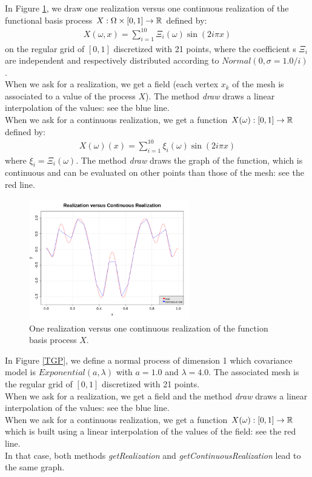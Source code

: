              In Figure \ref{FBP}, we draw one realization versus one continuous realization of the functional basis process $X: \Omega \times [0,1] \rightarrow {\mathbb R}$ defined by:
             \begin{align}
               X(\omega, x)=\sum_{i=1}^{10} \Xi_{i}(\omega)\sin(2i\pi x)
             \end{align}
             on the regular grid  of $[0,1]$ discretized with 21 points, where the coefficient s $\Xi_i$ are independent and respectively distributed according to $Normal(0,\sigma=1.0/i)$.\\
             When we ask for a realization, we get a field (each vertex $x_k$ of the mesh is associated to a value of the process $X$). The method \textit{draw} draws a linear interpolation of the values: see the blue line.\\
             When we ask for a continuous realization, we get a function $X(\omega): [0,1] \rightarrow {\mathbb R}$ defined by:
             \begin{align}
               X(\omega)(x)=\sum_{i=1}^{10} \xi_{i}(\omega)\sin(2i\pi x)
             \end{align}
             where $ \xi_{i}= \Xi_{i}(\omega)$.  The method \textit{draw} draws the graph of the function, which is continuous and can be evaluated on other points than those of the mesh: see the red line.


             \begin{figure}[H]
               \begin{center}
                 \includegraphics[width=7cm]{Figures/FuncBasProc_real.png}
                 \caption{One realization versus one continuous realization of the function basis process $X$.}
                 \label{FBP}
               \end{center}
             \end{figure}


             In Figure \ref{TGP}, we define a normal process of dimension 1 which covariance model is $Exponential(a,\lambda)$ with $a=1.0$ and $\lambda=4.0$. The associated mesh is the regular grid of $[0,1]$ discretized with 21 points.\\
             When we ask for a realization, we get a field and the method \textit{draw} draws a linear interpolation of the values: see the blue line.\\
             When we ask for a continuous realization, we get a function $X(\omega): [0,1] \rightarrow {\mathbb R}$ which is built using a linear interpolation of the values of the field: see the red line. \\
             In that case, both methods \emph{getRealization} and \emph{getContinuousRealization} lead to the same graph.


